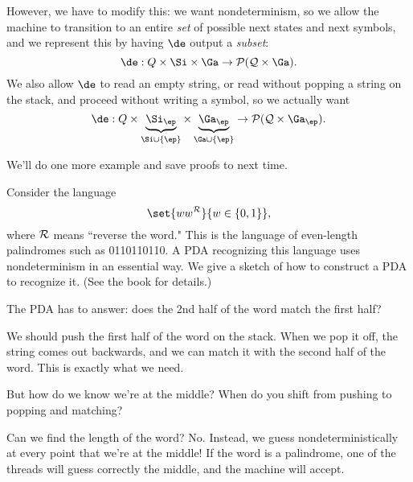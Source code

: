 However, we have to modify this: we want nondeterminism, so we allow the machine to transition to an entire {\it set} of possible next states and next symbols, and we represent this by having $\de$ output a {\it subset}:
\[\de:Q\times \Si\times \Ga\to \cal P(Q\times \Ga).\]
We also allow $\de$ to read an empty string, or read without popping a string on the stack, and proceed without writing a symbol, %
so we actually want
\[
\de:Q\times \underbrace{\Si_{\ep}}_{\Si\cup \{\ep\}}\times \underbrace{\Ga_{\ep}}_{\Ga\cup \{\ep\}}\to \cal P(Q\times \Ga_{\ep}).
\]

We'll do one more example and save proofs to next time.

\begin{ex}
Consider the language
\[
\set{ww^{\cal R}}{w\in \{0,1\}},
\]
where $\cal R$ means ``reverse the word."
This is the language of even-length palindromes such as 0110110110. A PDA recognizing this language uses nondeterminism in an essential way. We give a sketch of how to construct a PDA to recognize it. (See the book for details.)

The PDA has to answer: does the 2nd half of the word match the first half?

We should push the first half of the word on the stack. When we pop it off, the string comes out backwards, and we can match it with the second half of the word. This is exactly what we need. 

But how do we know we're at the middle? When do you shift from pushing to popping and matching?

Can we find the length of the word? No. Instead, we guess nondeterministically at every point that we're at the middle! If the word is a palindrome, one of the threads will guess correctly the middle, and the machine will accept. %
\end{ex}